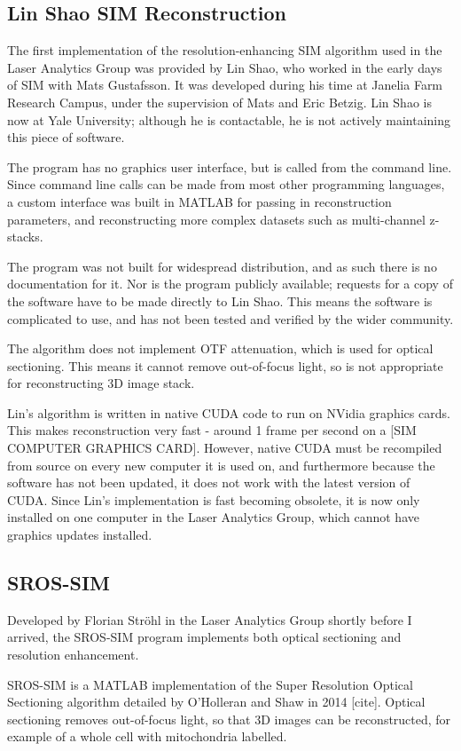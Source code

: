 \subsection{Lin Shao SIM Reconstruction}
The first implementation of the resolution-enhancing SIM algorithm used in the Laser Analytics Group was provided by Lin Shao, who worked in the early days of SIM with Mats Gustafsson.
It was developed during his time at Janelia Farm Research Campus, under the supervision of Mats and Eric Betzig.
Lin Shao is now at Yale University; although he is contactable, he is not actively maintaining this piece of software.

The program has no graphics user interface, but is called from the command line. 
Since command line calls can be made from most other programming languages, a custom interface was built in MATLAB for passing in reconstruction parameters, and reconstructing more complex datasets such as multi-channel z-stacks. 

The program was not built for widespread distribution, and as such there is no documentation for it. 
Nor is the program publicly available; requests for a copy of the software have to be made directly to Lin Shao. 
This means the software is complicated to use, and has not been tested and verified by the wider community. 

The algorithm does not implement OTF attenuation, which is used for optical sectioning.
This means it cannot remove out-of-focus light, so is not appropriate for reconstructing 3D image stack. 

Lin's algorithm is written in native CUDA code to run on NVidia graphics cards.
This makes reconstruction very fast - around 1 frame per second on a [SIM COMPUTER GRAPHICS CARD]. 
However, native CUDA must be recompiled from source on every new computer it is used on, and furthermore because the software has not been updated, it does not work with the latest version of CUDA. 
Since Lin's implementation is fast becoming obsolete, it is now only installed on one computer in the Laser Analytics Group, which cannot have graphics updates installed. 

\subsection{SROS-SIM}
Developed by Florian Str\"ohl in the Laser Analytics Group shortly before I arrived, the SROS-SIM program implements both optical sectioning and resolution enhancement. 

SROS-SIM is a MATLAB implementation of the Super Resolution Optical Sectioning algorithm detailed by O'Holleran and Shaw in 2014 [cite]. 
Optical sectioning removes out-of-focus light, so that 3D images can be reconstructed, for example of a whole cell with mitochondria labelled. %

